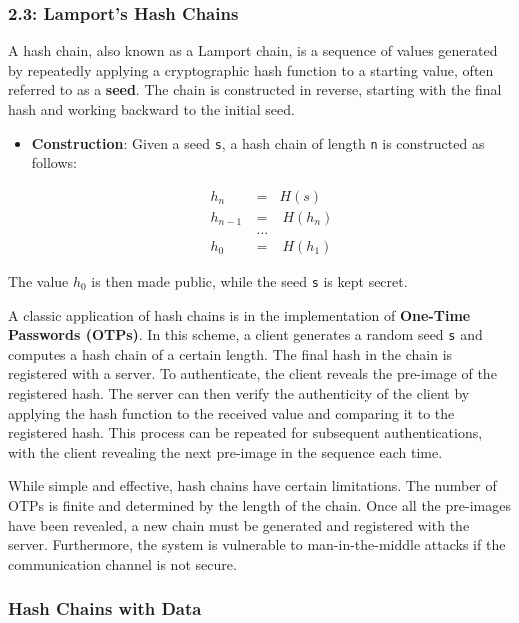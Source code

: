 \subsubsection{2.3: Lamport's Hash Chains}\label{lamports-hash-chains}

A hash chain, also known as a Lamport chain, is a sequence of values
generated by repeatedly applying a cryptographic hash function to a
starting value, often referred to as a \textbf{seed}. The chain is constructed in
reverse, starting with the final hash and working backward to the
initial seed.

\begin{itemize}
	\tightlist
	\item
	\textbf{Construction}: Given a seed \texttt{s}, a hash chain of length
	\texttt{n} is constructed as follows:
	
	\begin{eqnarray*}
		h_n\ &=& H(s) \\
		h_{n-1}\ &=&\ H(h_n) \\
		&\ldots& \\
		h_0\ &=&\ H(h_1)
	\end{eqnarray*}

\end{itemize}

The value \texttt{$h_0$} is then made public, while the seed \texttt{s}
is kept secret.

\medskip
A classic application of hash chains is in the implementation of
\textbf{One-Time Passwords (OTPs)}. In this scheme, a client generates a
random seed \texttt{s} and computes a hash chain of a certain length.
The final hash in the chain is registered with a server. To
authenticate, the client reveals the pre-image of the registered hash.
The server can then verify the authenticity of the client by applying
the hash function to the received value and comparing it to the
registered hash. This process can be repeated for subsequent
authentications, with the client revealing the next pre-image in the
sequence each time.

While simple and effective, hash chains have certain limitations. The
number of OTPs is finite and determined by the length of the chain. Once
all the pre-images have been revealed, a new chain must be generated and
registered with the server. Furthermore, the system is vulnerable to
man-in-the-middle attacks if the communication channel is not secure.

\subsubsection{Hash Chains with Data}\label{hash-chains-with-data}


